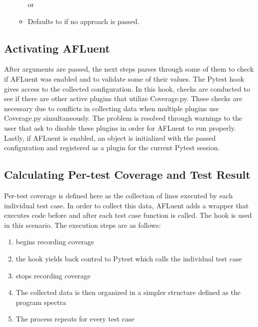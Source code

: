 \begin{itemize}
\begin{itemize}
		or 
		\item Defaults to  if no approach is passed.
    \end{itemize}
\end{itemize}

\subsection{Activating AFLuent}
\label{subsec:activate_afluent}

After arguments are passed, the next steps parses through some of them to check
if AFLuent was enabled and to validate some of their values. The Pytest hook
 gives access to the collected configuration. In
this hook, checks are conducted to see if there are other active plugins that
utilize Coverage.py. These checks are necessary due to conflicts in collecting
data when multiple plugins use Coverage.py simultaneously. The problem is
resolved through warnings to the user that ask to disable these plugins in order
for AFLuent to run properly. Lastly, if AFLuent is enabled, an  object is initialized
with the passed configuration and registered as a plugin for the current Pytest session.

\subsection{Calculating Per-test Coverage and Test Result}
\label{subsec:calculate_coverage}

Per-test coverage is defined here as the collection of lines executed by
each individual test case. In order to collect this data, AFLuent adds a wrapper
that executes code before and after each test case function is called. The
 hook is used in this scenario. The execution steps
are as follows:

\begin{enumerate}
    \item {} begins recording coverage
    \item the hook yields back control to Pytest which calls the individual test case
    \item {} stops recording coverage
    \item The collected data is then organized in a simpler structure defined as
    the program spectra
    \item The process repeats for every test case
\end{enumerate}

